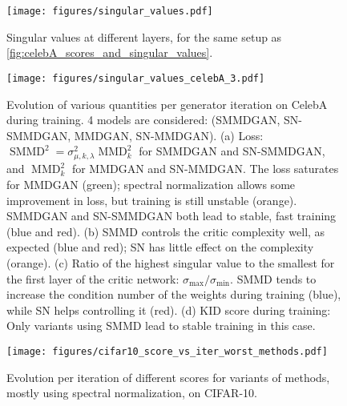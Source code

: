 \documentclass{article}
\DeclareMathOperator{\MMD}{MMD}
\DeclareMathOperator{\SMMD}{SMMD}
\begin{document}
\begin{figure}[ht]

        \centering
        \texttt{[image: figures/singular\_values.pdf]}
        \caption{Singular values at different layers, for the same setup as \cref{fig:celebA_scores_and_singular_values}.}
       \label{fig:singular_values-full}
\end{figure}

\begin{figure}[ht]
	        \centering
        \texttt{[image: figures/singular\_values\_celebA\_3.pdf]}
        \caption{Evolution of various quantities per generator iteration on CelebA during training. 4 models are considered: (SMMDGAN, SN-SMMDGAN, MMDGAN, SN-MMDGAN). (a) Loss: $\SMMD^2=\sigma_{\mu, k, \lambda}^2 \MMD^2_k$ for SMMDGAN and SN-SMMDGAN, and $\MMD_k^2$ for MMDGAN and SN-MMDGAN. The loss saturates for MMDGAN (green); spectral normalization allows some improvement in loss, but training is still unstable (orange). SMMDGAN and SN-SMMDGAN both lead to stable, fast training (blue and red). (b) SMMD controls the critic complexity well, as expected (blue and red); SN has little effect on the complexity (orange). (c) Ratio of the highest singular value to the smallest for the first layer of the critic network: $\sigma_{\max} / \sigma_{\min}$. SMMD tends to increase the condition number of the weights during training (blue), while SN helps controlling it (red). (d) KID score during training: Only variants using SMMD lead to stable training in this case.}
       \label{fig:loss_celebA}
\end{figure}


\begin{figure}[ht]
        \centering
        \texttt{[image: figures/cifar10\_score\_vs\_iter\_worst\_methods.pdf]}

        \caption{Evolution per iteration of different scores for variants of methods, mostly using spectral normalization, on CIFAR-10.}
       \label{fig:score_per_iter_cifar10_sn}
\end{figure}
\end{document}
